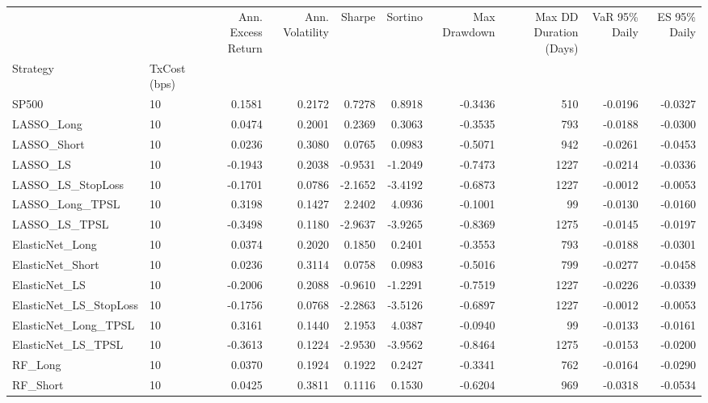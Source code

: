 \begin{tabular}{llrrrrrrrr}
\toprule
 &  & Ann. Excess Return & Ann. Volatility & Sharpe & Sortino & Max Drawdown & Max DD Duration (Days) & VaR 95\% Daily & ES 95\% Daily \\
Strategy & TxCost (bps) &  &  &  &  &  &  &  &  \\
\midrule
SP500 & 10 & 0.1581 & 0.2172 & 0.7278 & 0.8918 & -0.3436 & 510 & -0.0196 & -0.0327 \\
\cline{1-10}
LASSO\_Long & 10 & 0.0474 & 0.2001 & 0.2369 & 0.3063 & -0.3535 & 793 & -0.0188 & -0.0300 \\
\cline{1-10}
LASSO\_Short & 10 & 0.0236 & 0.3080 & 0.0765 & 0.0983 & -0.5071 & 942 & -0.0261 & -0.0453 \\
\cline{1-10}
LASSO\_LS & 10 & -0.1943 & 0.2038 & -0.9531 & -1.2049 & -0.7473 & 1227 & -0.0214 & -0.0336 \\
\cline{1-10}
LASSO\_LS\_StopLoss & 10 & -0.1701 & 0.0786 & -2.1652 & -3.4192 & -0.6873 & 1227 & -0.0012 & -0.0053 \\
\cline{1-10}
LASSO\_Long\_TPSL & 10 & 0.3198 & 0.1427 & 2.2402 & 4.0936 & -0.1001 & 99 & -0.0130 & -0.0160 \\
\cline{1-10}
LASSO\_LS\_TPSL & 10 & -0.3498 & 0.1180 & -2.9637 & -3.9265 & -0.8369 & 1275 & -0.0145 & -0.0197 \\
\cline{1-10}
ElasticNet\_Long & 10 & 0.0374 & 0.2020 & 0.1850 & 0.2401 & -0.3553 & 793 & -0.0188 & -0.0301 \\
\cline{1-10}
ElasticNet\_Short & 10 & 0.0236 & 0.3114 & 0.0758 & 0.0983 & -0.5016 & 799 & -0.0277 & -0.0458 \\
\cline{1-10}
ElasticNet\_LS & 10 & -0.2006 & 0.2088 & -0.9610 & -1.2291 & -0.7519 & 1227 & -0.0226 & -0.0339 \\
\cline{1-10}
ElasticNet\_LS\_StopLoss & 10 & -0.1756 & 0.0768 & -2.2863 & -3.5126 & -0.6897 & 1227 & -0.0012 & -0.0053 \\
\cline{1-10}
ElasticNet\_Long\_TPSL & 10 & 0.3161 & 0.1440 & 2.1953 & 4.0387 & -0.0940 & 99 & -0.0133 & -0.0161 \\
\cline{1-10}
ElasticNet\_LS\_TPSL & 10 & -0.3613 & 0.1224 & -2.9530 & -3.9562 & -0.8464 & 1275 & -0.0153 & -0.0200 \\
\cline{1-10}
RF\_Long & 10 & 0.0370 & 0.1924 & 0.1922 & 0.2427 & -0.3341 & 762 & -0.0164 & -0.0290 \\
\cline{1-10}
RF\_Short & 10 & 0.0425 & 0.3811 & 0.1116 & 0.1530 & -0.6204 & 969 & -0.0318 & -0.0534 \\
\cline{1-10}

\end{tabular}
